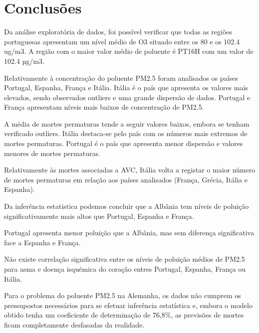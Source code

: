 \documentclass[conference]{IEEEtran}
\begin{document}
\section*{Conclusões}

Da análise exploratória de dados, foi possível verificar que todas as regiões portuguesas apresentam um nível médio de O3 situado entre os 80 e os 102.4 ug/m3. A região com o maior valor médio de poluente é PT16H com um valor de 102.4 µg/m3.

Relativamente à concentração do poluente PM2.5 foram analisados os países Portugal, Espanha, França e Itália. Itália é o país que apresenta os valores mais elevados, sendo observados outliers e uma grande dispersão de dados. Portugal e França apresentam níveis mais baixos de concentração de PM2.5.

A média de mortes permaturas tende a seguir valores baixos, embora se tenham verificado outliers. Itália destaca-se pelo país com os números mais extremos de mortes permaturas. Portugal é o país que apresenta menor dispersão e valores menores de mortes permaturas.

Relativamente às mortes associadas a AVC, Itália volta a registar o maior número de mortes permaturas em relação aos países analisados (França, Grécia, Itália e Espanha).

Da inferência estatistica podemos concluir que a Albânia tem níveis de poluição significativamente mais altos que Portugal, Espanha e França.

Portugal apresenta menor poluição que a Albânia, mas sem diferença significativa face a Espanha e França.

Não existe correlação significativa entre os níveis de poluição médios de PM2.5 para asma e doença isquémica do coração entres Portugal, Espanha, França ou Itália.

Para o problema do poluente PM2.5 na Alemanha, os dados não cumprem os pressupostos necessários para se efetuar inferência estatística e, embora o modelo obtido tenha um coeficiente de determinação de 76,8\%, as previsões de mortes ficam completamente desfasadas da realidade.
\end{document}
